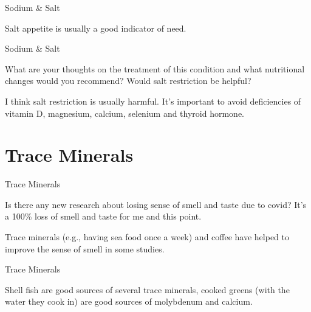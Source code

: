 \documentclass[11pt,oneside,openany,extrafontsizes]{memoir}
\begin{document}
\begin{standalonequote}{Sodium \& Salt}

    \begin{answer}
      Salt appetite is usually a good indicator of need.
    \end{answer}
\end{standalonequote}

\begin{qaexchange}{Sodium \& Salt}

    \begin{question}
        What are your thoughts on the treatment of this condition and what nutritional changes would you recommend? Would salt restriction be helpful?
    \end{question}

    \begin{answer}
      I think salt restriction is usually harmful. It's important to avoid deficiencies of vitamin D, magnesium, calcium, selenium and thyroid hormone.
    \end{answer}
\end{qaexchange}

\section{Trace Minerals}

\begin{qaexchange}{Trace Minerals}

    \begin{question}
        Is there any new research about losing sense of smell and taste due to covid? It's a 100\% loss of smell and taste for me and this point.
    \end{question}

    \begin{answer}
      Trace minerals (e.g., having sea food once a week) and coffee have helped to improve the sense of smell in some studies. 
    \end{answer}
\end{qaexchange}

\begin{standalonequote}{Trace Minerals}

    \begin{answer}     
		Shell fish are good sources of several trace minerals, cooked greens (with the water they cook in) are good sources of molybdenum and calcium.
    \end{answer}
\end{standalonequote}
\end{document}
